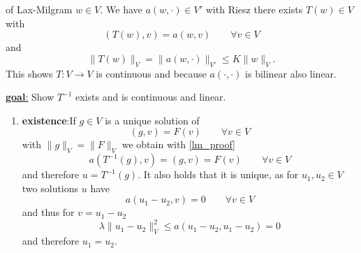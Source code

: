 \begin{proof_}
	of Lax-Milgram \enter
	$w \in V$. We have $a(w,\cdot) \in V'$ with Riesz there exists $T(w) \in V$ with 
	\begin{equation}\label{lm_proof}
		(T(w),v) = a(w,v) \qquad \forall v \in V
	\end{equation}
	and 
	\begin{equation*}
		\|T(w)\|_V = \|a(w,\cdot)\|_{V'} \leq K \|w\|_V.
	\end{equation*}
	This shows $T: V \to V$ is continuous and because $a(\cdot,\cdot)$ is bilinear also linear.
\end{proof_}

\par
\underline{\textbf{goal}:}
Show $T^{-1}$ exists and is continuous and linear.\enter

\begin{enumerate}[=label=(\alph*)]
	\item \textbf{existence}:\enter If $g \in V$ is a unique solution of 
	\begin{equation*}
	(g,v) = F(v) \qquad \forall v \in V
	\end{equation*}
	with $\|g\|_V = \|F\|_V$ we obtain with \eqref{lm_proof} 
	\begin{equation*}
	a(T^{-1}(g),v) = (g,v) = F(v) \qquad \forall v \in V
	\end{equation*}
	and therefore $u = T^{-1}(g)$. It also holds that it is unique, as for $u_1, u_2 \in V$ two solutions $u$ have 
	\begin{equation*}
	a(u_1 - u_2,v) = 0 \qquad \forall v \in V
	\end{equation*}
	and thus for $v = u_1 - u_2$
	\begin{equation*}
	\lambda \|u_1 - u_2\|^2_V \leq a(u_1 -u_2, u_1 -u_2) = 0
	\end{equation*}
	and therefore $u_1 = u_2$.
	

\end{enumerate}
